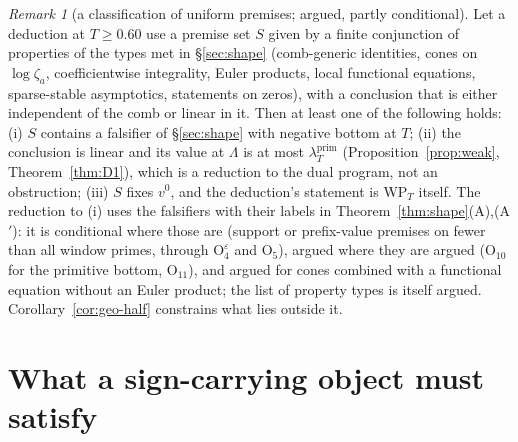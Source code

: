 \documentclass[11pt]{amsart}
\theoremstyle{definition}
\theoremstyle{remark}
\newtheorem{remark}[theorem]{Remark}
\newcommand{\lamP}{\lambda^{\mathrm{prim}}_T}
\begin{document}
\begin{remark}[a classification of uniform premises; argued, partly conditional]\label{rem:geo-trich}
Let a deduction at $T\ge0.60$ use a premise set $S$ given by a finite conjunction of properties of the types met in
\S\ref{sec:shape} (comb-generic identities, cones on $\log\zeta_a$, coefficientwise integrality, Euler products, local functional
equations, sparse-stable asymptotics, statements on zeros), with a conclusion that is either independent of the comb or linear in it.
Then at least one of the following holds: (i) $S$ contains a falsifier of \S\ref{sec:shape} with negative bottom at $T$; (ii) the
conclusion is linear and its value at $\Lambda$ is at most $\lamP$ (Proposition~\ref{prop:weak}, Theorem~\ref{thm:D1}), which is a
reduction to the dual program, not an obstruction; (iii) $S$ fixes $v^0$, and the deduction's statement is $\mathrm{WP}_T$ itself. The
reduction to (i) uses the falsifiers with their labels in Theorem~\ref{thm:shape}(A),(A$'$): it is conditional where those are
(support or prefix-value premises on fewer than all window primes, through $\mathrm O_4^\varepsilon$ and $\mathrm O_5$), argued where
they are argued ($\mathrm O_{10}$ for the primitive bottom, $\mathrm O_{11}$), and argued for cones combined with a functional equation
without an Euler product; the list of property types is itself argued. Corollary~\ref{cor:geo-half} constrains what lies outside it.
\end{remark}

\section{What a sign-carrying object must satisfy}\label{sec:spec}
\end{document}
